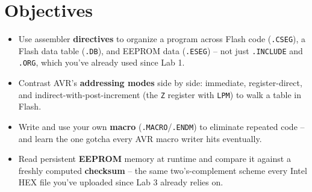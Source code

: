 \documentclass[11pt]{article}
\begin{document}
\labheader

\section*{Objectives}
\begin{itemize}[leftmargin=*,nosep]
  \item Use assembler \textbf{directives} to organize a program across Flash code
        (\texttt{.CSEG}), a Flash data table (\texttt{.DB}), and EEPROM data
        (\texttt{.ESEG}) -- not just \texttt{.INCLUDE} and \texttt{.ORG}, which
        you've already used since Lab 1.
  \item Contrast AVR's \textbf{addressing modes} side by side: immediate,
        register-direct, and indirect-with-post-increment (the \texttt{Z} register
        with \texttt{LPM}) to walk a table in Flash.
  \item Write and use your own \textbf{macro} (\texttt{.MACRO}/\texttt{.ENDM}) to
        eliminate repeated code -- and learn the one gotcha every AVR macro writer
        hits eventually.
  \item Read persistent \textbf{EEPROM} memory at runtime and compare it against a
        freshly computed \textbf{checksum} -- the same two's-complement scheme
        every Intel HEX file you've uploaded since Lab 3 already relies on.
\end{itemize}
\end{document}
